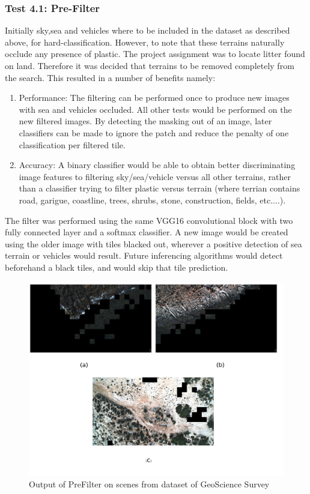 \documentclass{IEEEtran}
\begin{document}
\subsubsection{Test 4.1: Pre-Filter} Initially sky,sea and vehicles where to be included in the dataset as described above, for hard-classification. However, to note that these terrains naturally occlude any presence of plastic. The project assignment was to locate litter found on land. Therefore it was decided that terrains to be removed completely from the search. This resulted in a number of benefits namely:
\begin{enumerate}
\item Performance: The filtering can be performed once to produce new images with sea and vehicles occluded. All other tests would be performed on the new filtered images. By detecting the masking out of an image, later classifiers can be made to ignore the patch and reduce the penalty of one classification per filtered tile.
\item Accuracy: A binary classifier would be able to obtain better discriminating image features to filtering sky/sea/vehicle versus all other terrains, rather than a classifier trying to filter plastic versus terrain (where terrian contains road, garigue, coastline, trees, shrubs, stone, construction, fields, etc....). 
\end{enumerate}

The filter was performed using the same VGG16 convolutional block with two fully connected layer and a softmax classifier. A new image would be created using the older image with tiles blacked out, wherever a positive detection of sea terrain or vehicles would result. Future inferencing algorithms would detect beforehand a black tiles, and would skip that tile prediction.

\begin{figure}[H]
\centering
\includegraphics[scale=0.5]{images/filter-geo.png}
\caption{Output of PreFilter on scenes from dataset of GeoScience Survey}
\label{fig:prefiltergeo}
\end{figure}
\end{document}
